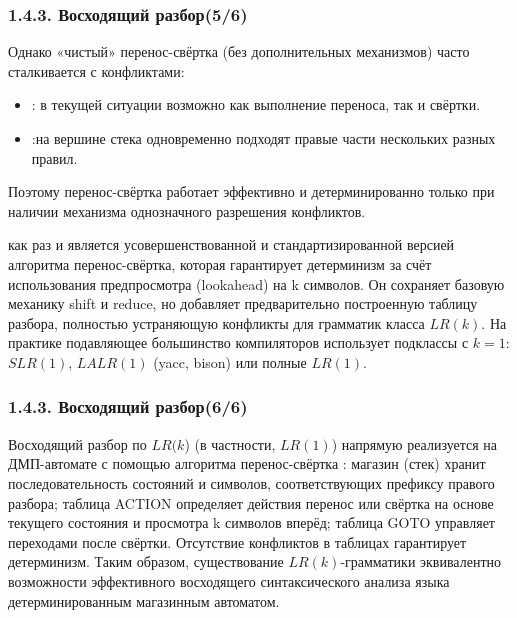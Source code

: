 \begin{frame}
\frametitle{1.4.3. Восходящий разбор(5/6)}

\begin{remark}
Однако «чистый» перенос-свёртка (без дополнительных механизмов) часто сталкивается с конфликтами:
\begin{itemize}
\item {}: в текущей ситуации возможно как выполнение переноса, так и свёртки.
\item {}:на вершине стека одновременно подходят правые части нескольких разных правил.
\end{itemize}
Поэтому перенос-свёртка работает эффективно и детерминированно только при наличии механизма однозначного разрешения конфликтов. \\
\end{remark}
 как раз и является усовершенствованной и стандартизированной версией алгоритма перенос-свёртка, которая гарантирует детерминизм за счёт использования предпросмотра (lookahead) на k символов. Он сохраняет базовую механику shift и reduce, но добавляет предварительно построенную таблицу разбора, полностью устраняющую конфликты для грамматик класса $LR(k)$. На практике подавляющее большинство компиляторов использует подклассы с $k=1$: $SLR(1)$, $LALR(1)$ (yacc, bison) или полные $LR(1)$.

\end{frame}


\begin{frame}
\frametitle{1.4.3. Восходящий разбор(6/6)}
Восходящий разбор по $LR(k$) (в частности, $LR(1)$) напрямую реализуется на ДМП-автомате с помощью алгоритма перенос-свёртка : магазин (стек) хранит последовательность состояний и символов, соответствующих префиксу правого разбора; таблица ACTION определяет действия перенос  или свёртка  на основе текущего состояния и просмотра k символов вперёд; таблица GOTO управляет переходами после свёртки. Отсутствие конфликтов в таблицах гарантирует детерминизм. Таким образом, существование $LR(k)$-грамматики эквивалентно возможности эффективного восходящего синтаксического анализа языка детерминированным магазинным автоматом.

\bigskip
{} 

\end{frame}


